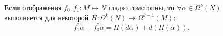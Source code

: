 \begin{to_thr}
	\textbf{Если} отображения $f_0, f_1 \colon M \mapsto N$ гладко гомотопны, \textbf{то} $\forall \alpha \in \Omega^k (N)$ выполняется для некоторой $H \colon \Omega^k (N) \mapsto \Omega^{k-1}(M)$:
	\begin{equation*}
		f_1^* \alpha - f_0^*\alpha = H(d \alpha) + d(H(\alpha)).
	\end{equation*}
\end{to_thr}